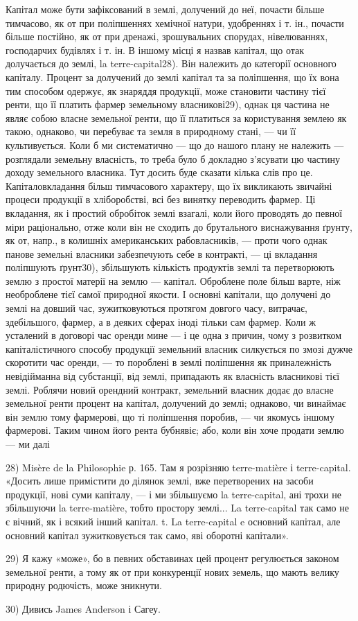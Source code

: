 Капітал може бути зафіксований в землі, долучений до неї, почасти
більше тимчасово, як от при поліпшеннях хемічної натури, удобреннях і т. ін.,
почасти більше постійно, як от при дренажі, зрошувальних спорудах, нівелюваннях,
господарчих будівлях і т. ін. В іншому місці я назвав капітал, що
отак долучається до землі, la terre-capital28). Він належить до категорії основного
капіталу. Процент за долучений до землі капітал та за поліпшення, що їх вона
тим способом одержує, як знаряддя продукції, може становити частину тієї
ренти, що її платить фармер земельному власникові29), однак ця частина не
являє собою власне земельної ренти, що її платиться за користування землею
як такою, однаково, чи перебуває та земля в природному стані, — чи її культивується.
Коли б ми систематично — що до нашого плану не належить — розглядали
земельну власність, то треба було б докладно з’ясувати цю частину
доходу земельного власника. Тут досить буде сказати кілька слів про це.
Капіталовкладання більш тимчасового характеру, що їх викликають звичайні
процеси продукції в хліборобстві, всі без винятку переводить фармер. Ці вкладання,
як і простий обробіток землі взагалі, коли його проводять до певної
міри раціонально, отже коли він не сходить до брутального виснажування
ґрунту, як от, напр., в колишніх американських рабовласників, — проти чого
однак панове земельні власники забезпечують себе в контракті, — ці вкладання
поліпшують ґрунт30), збільшують кількість продуктів землі та перетворюють
землю з простої матерії на землю — капітал. Оброблене поле більш варте, ніж
необроблене тієї самої природної якости. І основні капітали, що долучені до
землі на довший час, зужитковуються протягом довгого часу, витрачає, здебільшого,
фармер, а в деяких сферах іноді тільки сам фармер. Коли ж усталений в
договорі час оренди мине — і це одна з причин, чому з розвитком капіталістичного
способу продукції земельний власник силкується по змозі дужче скоротити
час оренди, — то пороблені в землі поліпшення як приналежність невідійманна
від субстанції, від землі, припадають як власність власникові тієї землі.
Роблячи новий орендний контракт, земельний власник додає до власне земельної
ренти процент на капітал, долучений до землі; однаково, чи винаймає він землю
тому фармерові, що ті поліпшення поробив, — чи якомусь іншому фармерові.
Таким чином його рента бубнявіє; або, коли він хоче продати землю — ми далі

28) Misère de la Philosophie р. 165. Там я розрізняю terre-matière і terre-capital. «Досить лише
примістити до ділянок землі, вже перетворених на засоби продукції, нові суми капіталу, — і ми
збільшуємо la terre-capital, ані трохи не збільшуючи la terre-matière, тобто простору землі... La
terre-capital так само не є вічний, як і всякий інший капітал. t. La terre-capital e основний
капітал, але основний капітал зужитковується так само, яві оборотні капітали».

29) Я кажу «може», бо в певних обставинах цей процент регулюється законом земельної ренти, а тому як
от при конкуренції нових земель, що мають велику природну родючість, може зникнути.

30) Дивись James Anderson і Сагеу.
